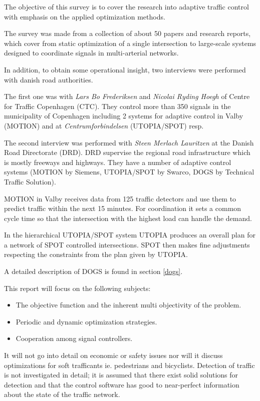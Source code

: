 \label{scope}
The objective of this survey is to cover the research into adaptive traffic control with emphasis on the applied optimization methods.

The survey was made from a collection of about 50 papers and research reports, which cover from static optimization of a single intersection to large-scale systems designed to coordinate signals in multi-arterial networks. 

In addition, to obtain some operational insight, two interviews were performed with danish road authorities. 

The first one was with \textit{Lars Bo Frederiksen} and \textit{Nicolai Ryding Hoegh} of Centre for Traffic Copenhagen (CTC). They control more than 350 signals in the municipality of Copenhagen including 2 systems for adaptive control in Valby (MOTION) and at \textit{Centrumforbindelsen} (UTOPIA/SPOT) resp. 

The second interview was performed with \textit{Steen Merlach Lauritzen} at the Danish Road Directorate (DRD). DRD supervise the regional road infrastructure which is mostly freeways and highways. They have a number of adaptive control systems (MOTION by Siemens, UTOPIA/SPOT by Swarco, DOGS by Technical Traffic Solution).

MOTION in Valby receives data from 125 traffic detectors and use them to predict traffic within the next 15 minutes. For coordination it sets a common cycle time so that the intersection with the highest load can handle the demand.

In the hierarchical UTOPIA/SPOT system UTOPIA produces an overall plan for a network of SPOT controlled intersections. SPOT then makes fine adjustments respecting the constraints from the plan given by UTOPIA.

A detailed description of DOGS is found in section \ref{dogs}.

This report will focus on the following subjects:

\begin{itemize}
\item The objective function and the inherent multi objectivity of the problem.
\item Periodic and dynamic optimization strategies.
\item Cooperation among signal controllers.
\end{itemize}

It will not go into detail on economic or safety issues nor will it discuss optimizations for soft trafficants ie. pedestrians and bicyclists. Detection of traffic is not investigated in detail; it is assumed that there exist solid solutions for detection and that the control software has good to near-perfect information about the state of the traffic network.
